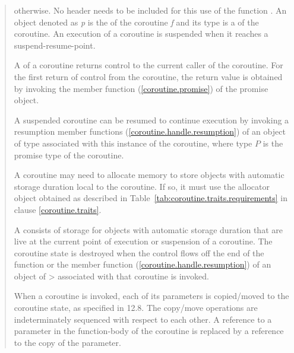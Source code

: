 \begin{quote}
otherwise. 
No header needs to be included for this use of the function .
An object denoted as \textit{p} is the  of
the coroutine \textit{f} and its type is a 
of the coroutine.
An execution of a coroutine is suspended when it reaches a suspend-resume-point.

\pnum 
A  of a coroutine returns control to the current
caller of the coroutine. For the first return of control from the coroutine, the return value is obtained by invoking the member function 
 (\ref{coroutine.promise})
of the promise object.


\pnum
A suspended coroutine can be resumed
to continue execution by invoking
a resumption member functions (\ref{coroutine.handle.resumption}) of an object of  type
associated with this instance of the coroutine, where type $P$
is the promise type of the coroutine. 

\pnum
A coroutine may need to allocate
memory to store objects with automatic storage duration
local to the coroutine. If so, it must
use the allocator object obtained as described in 
Table~\ref{tab:coroutine.traits.requirements} in clause \ref{coroutine.traits}.

\pnum
A  consists of 
storage for objects with automatic storage duration
that are live at the current point of execution or suspension of 
a coroutine.
The coroutine state is destroyed when
the control flows off the end of the function or
the  member function (\ref{coroutine.handle.resumption}) of an object of > associated with that coroutine is invoked.

\pnum



\pnum
When a coroutine is invoked, each of its parameters is copied/moved to the coroutine state, as specified in 12.8.  The copy/move operations are indeterminately sequenced with respect to each other.
A reference to a parameter in the function-body of the coroutine is replaced by a reference to the copy of the parameter.


\end{quote}

